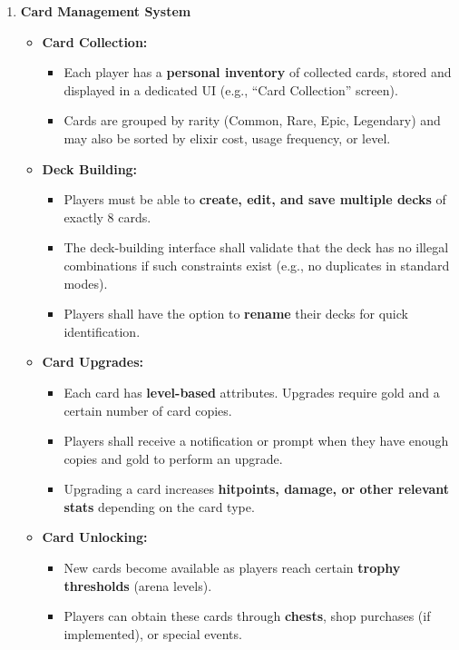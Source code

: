 \documentclass{article}
\begin{document}
\begin{enumerate}[label=\textbf{FR\arabic*.}]
\item \textbf{Card Management System}
\begin{itemize}
    \item \textbf{Card Collection:}
    \begin{itemize}
        \item Each player has a \textbf{personal inventory} of collected cards, stored and displayed in a dedicated UI (e.g., ``Card Collection'' screen).
        \item Cards are grouped by rarity (Common, Rare, Epic, Legendary) and may also be sorted by elixir cost, usage frequency, or level.
    \end{itemize}
    \item \textbf{Deck Building:}
    \begin{itemize}
        \item Players must be able to \textbf{create, edit, and save multiple decks} of exactly 8 cards.
        \item The deck-building interface shall validate that the deck has no illegal combinations if such constraints exist (e.g., no duplicates in standard modes).
        \item Players shall have the option to \textbf{rename} their decks for quick identification.
    \end{itemize}
    \item \textbf{Card Upgrades:}
    \begin{itemize}
        \item Each card has \textbf{level-based} attributes. Upgrades require gold and a certain number of card copies.
        \item Players shall receive a notification or prompt when they have enough copies and gold to perform an upgrade.
        \item Upgrading a card increases \textbf{hitpoints, damage, or other relevant stats} depending on the card type.
    \end{itemize}
    \item \textbf{Card Unlocking:}
    \begin{itemize}
        \item New cards become available as players reach certain \textbf{trophy thresholds} (arena levels).
        \item Players can obtain these cards through \textbf{chests}, shop purchases (if implemented), or special events.
    \end{itemize}
\end{itemize}


\end{enumerate}
\end{document}
